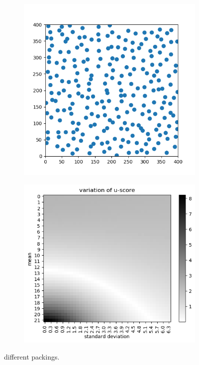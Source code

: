 \documentclass{article}
\begin{document}
\begin{figure}[h]
	\centering
	\begin{subfigure}[t]{0.38\linewidth}
		\centering
		\includegraphics[width = 1.0\linewidth, trim={0 0 0 0}, clip=true]{ref.png}
		\label{fig:ref}	
	\end{subfigure}
	\hspace{0.06\linewidth}
	\begin{subfigure}[t]{0.38\linewidth}
		\centering
		\includegraphics[width = 1.0\linewidth, trim={0 0 0 0}, clip=true]{similarity_gray_good.png}
		\label{fig:sim}	
	\end{subfigure}
\label{fig:descent}
\caption{different packings.}
\end{figure}
\end{document}
